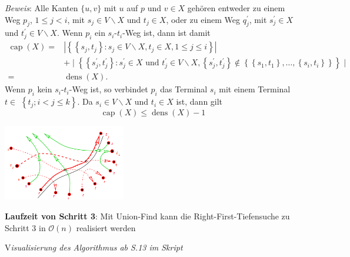 \textit{Beweis}: Alle Kanten $\{u, v\}$ mit $u$ auf $p$ und $v \in X$ gehören entweder zu einem Weg $p_{j}$, $1 \leq j<i$, mit $s_{j} \in V \backslash X$ und $t_{j} \in X$, oder zu einem Weg $q_{j}^{\prime}$, mit $s_{j}^{\prime} \in X$ und $t_{j}^{\prime} \in V \backslash X$. Wenn $p_{i}$ ein $s_{i}$-$t_{i}$-Weg ist, dann ist damit
$$
\begin{aligned}
	\operatorname{cap}(X)= & \left|\left\{\left\{s_{j}, t_{j}\right\}: s_{j} \in V \backslash X, t_{j} \in X, 1 \leq j \leq i\right\}\right| \\
	& +\mid\left\{\left\{s_{j}^{\prime}, t_{j}^{\prime}\right\}: s_{j}^{\prime} \in X \text { und } t_{j}^{\prime} \in V \backslash X,\left\{s_{j}^{\prime}, t_{j}^{\prime}\right\} \notin\left\{\left\{s_{1}, t_{1}\right\}, \ldots,\left\{s_{i}, t_{i}\right\}\right\}\right\} \mid \\
	= & \operatorname{dens}(X) .
\end{aligned}
$$
Wenn $p_{i}$ kein $s_{i}$-$t_{i}$-Weg ist, so verbindet $p_{i}$ das Terminal $s_{i}$ mit einem Terminal $t \in$ $\left\{t_{j} ; i<j \leq k\right\}$. Da $s_{i} \in V \backslash X$ und $t_{i} \in X$ ist, dann gilt
$$
\operatorname{cap}(X) \leq \operatorname{dens}(X)-1
$$
\begin{center}
	\includegraphics[width=0.4\textwidth]{images/s9.png}
\end{center}

\textbf{Laufzeit von Schritt 3}: Mit Union-Find kann die Right-First-Tiefensuche zu Schritt 3 in $\mathcal{O}(n)$ realisiert werden

V\textit{isualisierung des Algorithmus ab S.13 im Skript}